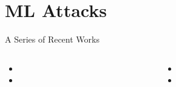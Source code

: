 \documentclass[table,10pt,aspectratio=169]{beamer}
\begin{document}
\section{ML Attacks}
\label{sec:org111008d}
\begin{frame}[label={sec:orgd300754}]{A Series of Recent Works}
\begin{columns}
\begin{column}[t]{0.5\columnwidth}
{\footnotesize

\begin{itemize}
\item {}
\item {}
\end{itemize}

\par}
\end{column}

\begin{column}[t]{0.5\columnwidth}
{\footnotesize

\begin{itemize}
\item {}
\item {}
\end{itemize}

\par}
\end{column}
\end{columns}
\end{frame}
\end{document}
